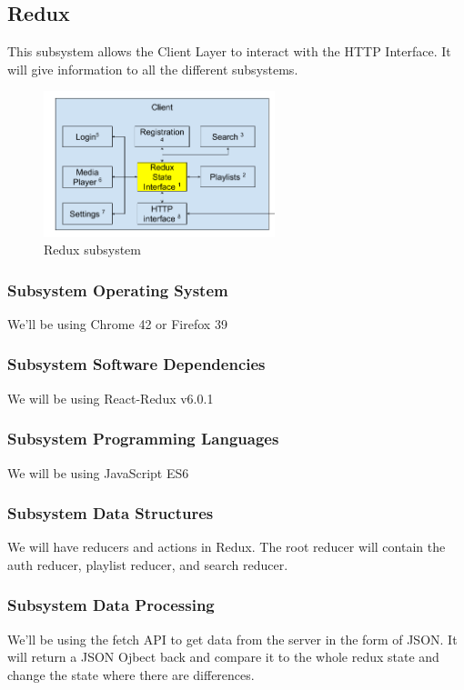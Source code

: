 \subsection{Redux}
This subsystem allows the Client Layer to interact with the HTTP Interface. It will give information to all the different subsystems.

\begin{figure}[h!]
	\centering
 	\includegraphics[width=0.60\textwidth]{images/client/client_redux.png}
 	\caption{Redux subsystem}
\end{figure}


\subsubsection{Subsystem Operating System}
We'll be using Chrome 42 or Firefox 39

\subsubsection{Subsystem Software Dependencies}
We will be using React-Redux v6.0.1 

\subsubsection{Subsystem Programming Languages}
We will be using JavaScript ES6

\subsubsection{Subsystem Data Structures}
We will have reducers and actions in Redux. The root reducer will contain the auth reducer, playlist reducer, and search reducer.

\subsubsection{Subsystem Data Processing}
We'll be using the fetch API to get data from the server in the form of JSON. It will return a JSON Ojbect back and compare it to the whole redux state and change the state where there are differences. 


\newpage
